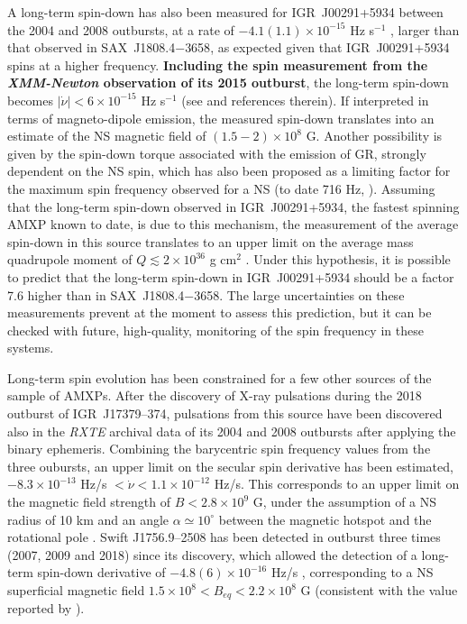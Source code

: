 \documentclass[graybox]{svmult}
\def \xmm {{\em XMM-Newton\xspace}}
\def \rxte {{\em RXTE\xspace}}
\def \saxj{{\rm SAX~J1808.4$-$3658\xspace}}
\begin{document}
A long-term spin-down has also been measured for IGR~J00291+5934 between the 2004 and 2008 outbursts, at a rate of $-4.1(1.1) \times 10^{-15}$ Hz s$^{-1}$ \cite{Papitto2011c,Patruno2010,Hartman2011}, larger than that observed in \saxj{}, as expected given that IGR~J00291+5934 spins at a higher frequency. \textbf{Including the spin measurement from the \xmm{} observation of its 2015 outburst}, the long-term spin-down becomes $|\dot{\nu}|< 6\times 10^{-15}$ Hz s$^{-1}$  (see \cite{Sanna2017d} and references therein). If interpreted in terms of magneto-dipole emission, the measured spin-down translates into an estimate of the NS magnetic field of $(1.5-2) \times 10^8$ G. Another possibility is given by the spin-down torque associated with the emission of GR, strongly dependent on the NS spin, which has also been proposed as a limiting factor for the maximum spin frequency observed for a NS (to date 716 Hz, \cite{Hessels2006}). Assuming that the long-term spin-down observed in IGR~J00291+5934, the fastest spinning AMXP known to date, is due to this mechanism, the measurement of the average spin-down in this source translates to an upper limit on the average mass quadrupole moment of $Q \lesssim 2 \times 10^{36}$ g cm$^2$ \cite{Hartman2011}. Under this hypothesis, it is possible to predict that the long-term spin-down in IGR~J00291+5934 should be a factor 7.6 higher than in \saxj{}. The large uncertainties on these measurements prevent at the moment to assess this prediction, but it can be checked with future, high-quality, monitoring of the spin frequency in these systems.

Long-term spin evolution has been constrained for a few other sources of the sample of AMXPs. After the discovery of X-ray pulsations during the 2018 outburst of IGR~J17379--374, pulsations from this source have been discovered also in the \rxte{} archival data of its 2004 and 2008 outbursts after applying the binary ephemeris. Combining the barycentric spin frequency values from the three oubursts, an upper limit on the secular spin derivative has been estimated, $-8.3\times10^{-13}$ Hz/s $<\dot{\nu}<1.1\times 10^{-12}$ Hz/s. This corresponds to an upper limit on the magnetic field strength of $B<2.8\times 10^9$ G, under the assumption of a NS radius of 10 km and an angle $\alpha\simeq 10^\circ$ between the magnetic hotspot and the rotational pole \cite{Sanna2018b}. Swift J1756.9--2508 has been detected in outburst three times (2007, 2009 and 2018) since its discovery, which allowed the detection of a long-term spin-down derivative of $-4.8(6)\times 10^{-16}$ Hz/s \cite{Sanna2019}, corresponding to a NS superficial magnetic field $1.5\times 10^8 < B_{eq} < 2.2\times 10^8$ G (consistent with the value reported by \cite{Mukherjee2015}).
 
\end{document}

